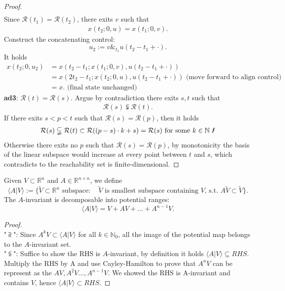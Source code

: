 \begin{proof}
\begin{align*}
\end{align*}
Since $\mathcal{R}(t_1) = \mathcal{R}(t_2)$, there exits $v$ such that 
\begin{align*}
	x(t_2; 0, u) = x(t_1;0, v). 
\end{align*}
Construct the concatenating control:
\begin{equation}
	u_2:= v \&_{t_1} u(t_2 - t_1 + \cdot).
\end{equation}
It holds
\begin{align*}
	x(t_2;0, u_2) &= x(t_2 - t_1; x(t_1;0, v), u(t_2 - t_1 + \cdot))\\
	&= x(2t_2 - t_1; x(t_2; 0, u), u(t_2 - t_1 + \cdot)) \text{ (move forward to align control)}\\
	&= x. \text{ (final state unchanged)}
\end{align*} 
\textbf{ad3}: $\mathcal{R}(t) = \mathcal{R}(s)$. Argue by contradiction there exits $s, t$ such that 
\begin{align*}
	\mathcal{R}(s) \subsetneqq \mathcal{R}(t).
\end{align*}
If there exits $s <  p< t $ such that $\mathcal{R}(s) = \mathcal{R}(p)$, then it holds
\begin{align*}
	\mathcal{R}(s) \subsetneqq \mathcal{R}(t) \subset \mathcal{R}((p - s)\cdot k + s) = \mathcal{R}(s) \text{ for some $k \in \mathbb{N}$ \Lightning}
\end{align*}
Otherwise there exits no $p$ such that $\mathcal{R}(s) = \mathcal{R}(p)$, by monotonicity the basis of the linear subspace would increase at every point between $t$ and $s$, which contradicts to the reachability set is finite-dimensional. 
 
\end{proof}

\begin{theorem}
	Given $V \subset \mathbb{R}^n$ and $A \in \mathbb{R}^{n \times n}$, we define 
	\begin{equation}
		\langle A| V \rangle:= \{ \tilde{V} \subset \mathbb{R}^n \text{ subspace}:  \quad \tilde{V} \text{ is smallest subspace containing $V$, s.t. $A \tilde{V} \subset \tilde{V}$} \}.
	\end{equation}
	The $A$-invariant is decomposable into potential ranges:
	\begin{equation}
		\langle A| V\rangle =  V + AV + \dots + A^{n -1} V . 
	\end{equation}
\end{theorem}
\begin{proof}
 \quad\\ 
  "$\supseteqq$": Since $A^k V \subset \langle A| V \rangle $ for all $k \in \mathbb{N}_0$, all the image of the potential map belongs to the $A$-invariant set. 
  \quad\\ 
"$\subseteqq$": Suffice to show the RHS is $A$-invariant, by definition it holds $\langle A|V \rangle \subseteq RHS$. \\ Multiply the RHS by A and use Cayley-Hamilton to prove that $A^n V$ can be represent as the $AV, A^2 V \dots, A^{n -1}V$.
We showed the RHS is A-invariant and contains $V$, hence $\langle A | V \rangle \subset RHS$. 
\end{proof}


